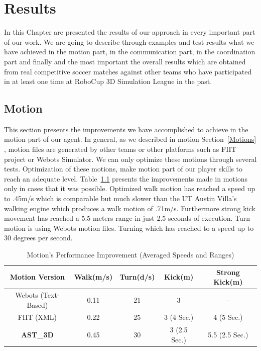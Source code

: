 \chapter{Results}
\label{results}
In this Chapter are presented the results of our approach in every important part of our work. We are going to describe through examples and test results what we have achieved in the motion part, in the communication part, in the coordination part and finally and the most important the overall results which are obtained from real competitive soccer matches against other teams who have participated in at least one time at RoboCup 3D Simulation League in the past.


\section{Motion}
This section presents the improvements we have accomplished to achieve in the motion part of our agent. In general, as we described in motion Section~\ref{Motions} , motion files are generated by other teams or other platforms such as FIIT project or Webots Simulator. We can only optimize these motions through several tests. Optimization of these motions, make motion part of our player skills to reach an adequate level. Table~\ref{MotionImprovements} presents the improvements made in motions only in cases that it was possible. Optimized walk motion has reached a speed up to .45m/s which is comparable but much slower than the UT Austin Villa's walking engine which produces a walk motion of .71m/s. Furthermore strong kick movement has reached a 5.5 meters range in just 2.5 seconds of execution. Turn motion is using Webots motion files. Turning which has reached to a speed up to 30 degrees per second. 

\begin{table}[t!]
\caption{Motion's Performance Improvement (Averaged Speeds and Ranges)}
\label{MotionImprovements}
\begin{center}
\begin{small}
\begin{tabular}{ccccc}
\textbf{Motion Version} & \textbf{Walk(m/s)}	& \textbf{Turn(d/s)}	& \textbf{Kick(m)}&\textbf{Strong Kick(m)} \\
\midrule
Webots (Text-Based) 		& 0.11 				& 21 				& 3 				& - \\
FIIT (XML)				& 0.22 				& 25 				& 3 (4 Sec.) 		& 4 (5 Sec.) \\
\textbf{AST\_3D} 		& 0.45 	& 30 		& 3 (2.5 Sec.)& 5.5 (2.5 Sec.) \\
\end{tabular}
\end{small}
\end{center}
\end{table}




